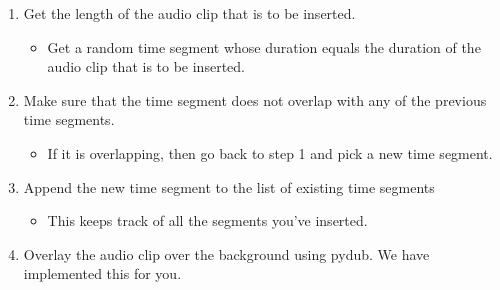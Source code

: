 \documentclass[11pt]{article}
\begin{document}
\begin{enumerate}
\def\labelenumi{\arabic{enumi}.}
\itemsep1pt\parskip0pt
\item
  Get the length of the audio clip that is to be inserted.

  \begin{itemize}
  \itemsep1pt\parskip0pt
  \item
    Get a random time segment whose duration equals the duration of the
    audio clip that is to be inserted.
  \end{itemize}
\item
  Make sure that the time segment does not overlap with any of the
  previous time segments.

  \begin{itemize}
  \itemsep1pt\parskip0pt
  \item
    If it is overlapping, then go back to step 1 and pick a new time
    segment.
  \end{itemize}
\item
  Append the new time segment to the list of existing time segments

  \begin{itemize}
  \itemsep1pt\parskip0pt
  \item
    This keeps track of all the segments you've inserted.\\
  \end{itemize}
\item
  Overlay the audio clip over the background using pydub. We have
  implemented this for you.
\end{enumerate}
\end{document}
